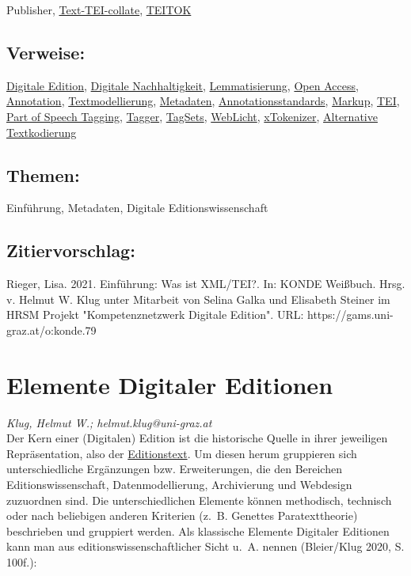 \documentclass{article}
\begin{document}
{                           Publisher}, \href{https://code.activestate.com/ppm/Text-TEI-Collate/}{Text-TEI-collate}, \href{http://www.teitok.org/index.php?action=about}{TEITOK}\subsection*{Verweise:}\href{https://gams.uni-graz.at/o:konde.59}{Digitale Edition}, \href{https://gams.uni-graz.at/o:konde.6}{Digitale Nachhaltigkeit}, \href{https://gams.uni-graz.at/o:konde.115}{Lemmatisierung}, \href{https://gams.uni-graz.at/o:konde.152}{Open Access}, \href{https://gams.uni-graz.at/o:konde.17}{Annotation}, \href{https://gams.uni-graz.at/o:konde.195}{Textmodellierung}, \href{https://gams.uni-graz.at/o:konde.25}{Metadaten}, \href{https://gams.uni-graz.at/o:konde.29}{Annotationsstandards}, \href{https://gams.uni-graz.at/o:konde.126}{Markup}, \href{https://gams.uni-graz.at/o:konde.178}{TEI}, \href{https://gams.uni-graz.at/o:konde.156}{Part of Speech Tagging}, \href{https://gams.uni-graz.at/o:konde.176}{Tagger}, \href{https://gams.uni-graz.at/o:konde.177}{TagSets}, \href{https://gams.uni-graz.at/o:konde.212}{WebLicht}, \href{https://gams.uni-graz.at/o:konde.216}{xTokenizer}, \href{https://gams.uni-graz.at/o:konde.15}{Alternative Textkodierung}\subsection*{Themen:}Einführung, Metadaten, Digitale Editionswissenschaft\subsection*{Zitiervorschlag:}Rieger, Lisa. 2021. Einführung: Was ist XML/TEI?. In: KONDE Weißbuch. Hrsg. v. Helmut W. Klug unter Mitarbeit von Selina Galka und Elisabeth Steiner im HRSM Projekt "Kompetenznetzwerk Digitale Edition". URL: https://gams.uni-graz.at/o:konde.79\newpage\section*{Elemente Digitaler Editionen} \emph{Klug, Helmut W.; helmut.klug@uni-graz.at }\\
        
    Der Kern einer (Digitalen) Edition ist die historische Quelle in ihrer jeweiligen Repräsentation, also der \href{http://gams.uni-graz.at/o:konde.75}{Editionstext}. Um diesen herum gruppieren sich unterschiedliche Ergänzungen bzw. Erweiterungen, die den Bereichen Editionswissenschaft, Datenmodellierung, Archivierung und Webdesign zuzuordnen sind. Die unterschiedlichen Elemente können methodisch, technisch oder nach beliebigen anderen Kriterien (z. B. Genettes Paratexttheorie) beschrieben und gruppiert werden. Als klassische Elemente Digitaler Editionen kann man aus editionswissenschaftlicher Sicht u. A. nennen (Bleier/Klug 2020, S. 100f.):\\
            
\end{document}

